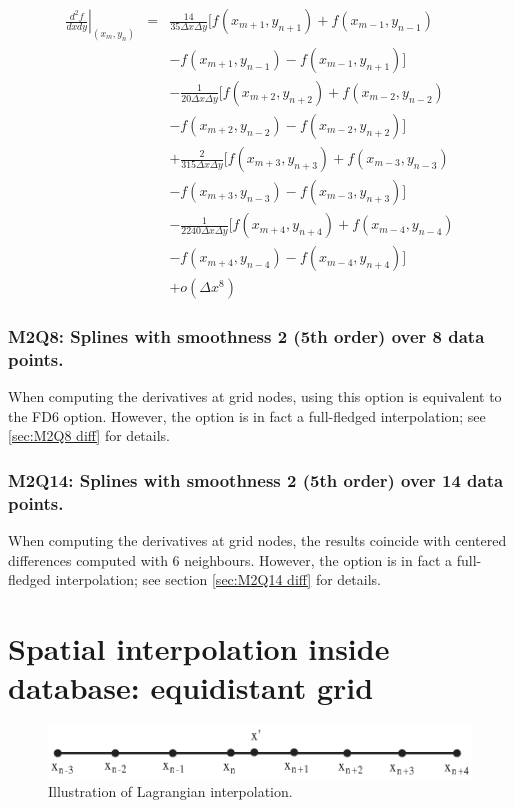 \documentclass[11pt]{article}
\def\bea{\begin{eqnarray}}
\def\eea{\end{eqnarray}}
\begin{document}
\bea \left.\frac{d^2f}{dxdy}\right|_{(x_m,y_n)} &=&
\frac{14}{35\Delta
x\Delta y}[f(x_{m+1},y_{n+1})+f(x_{m-1},y_{n-1})\nonumber\\
&&-f(x_{m+1},y_{n-1})-f(x_{m-1},y_{n+1})]\nonumber\\
&&-\frac{1}{20\Delta
x\Delta y}[f(x_{m+2},y_{n+2})+f(x_{m-2},y_{n-2})\nonumber\\
&&-f(x_{m+2},y_{n-2})-f(x_{m-2},y_{n+2})]\nonumber\\
&&+\frac{2}{315\Delta
x\Delta y}[f(x_{m+3},y_{n+3})+f(x_{m-3},y_{n-3})\nonumber\\
&&-f(x_{m+3},y_{n-3})-f(x_{m-3},y_{n+3})]\nonumber\\
&&-\frac{1}{2240\Delta
x\Delta y}[f(x_{m+4},y_{n+4})+f(x_{m-4},y_{n-4})\nonumber\\
&&-f(x_{m+4},y_{n-4})-f(x_{m-4},y_{n+4})]\nonumber\\
&&+o(\Delta x^8) \eea

\subsubsection*{M2Q8: Splines with smoothness 2 (5th order) over 8 data points.}
When computing the derivatives at grid nodes, using this option is equivalent to the FD6 option.
However, the option is in fact a full-fledged interpolation; see \ref{sec:M2Q8 diff} for details.
\subsubsection*{M2Q14: Splines with smoothness 2 (5th order) over 14 data points.}
When computing the derivatives at grid nodes, the results coincide with centered differences computed with 6
neighbours.
However, the option is in fact a full-fledged interpolation; see section \ref{sec:M2Q14 diff} for details.

\section{Spatial interpolation inside database: equidistant grid}
\label{sec:spa}
\begin{figure}[h]
\begin{minipage}{\linewidth}
\centering\includegraphics[width=1.0\linewidth]{Lagrangian.eps}
\end{minipage} \caption{Illustration of Lagrangian interpolation. }\label{Lagrangian}
\end{figure}
\end{document}
